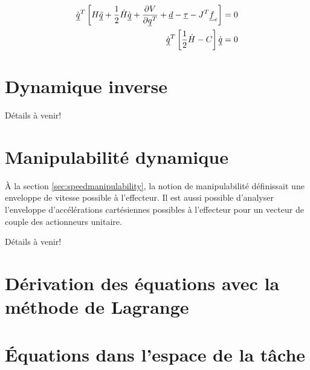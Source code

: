 \begin{align}
\dot{\underline{q}}^T \left[ H \underline{\ddot{q}} + \frac{1}{2}\dot{H}\dot{\underline{q}} + \frac{\partial V}{\partial \underline{q}^T} + \underline{d} - \underline{\tau} - J^T \underline{f}_e  \right] &= 0 \\
\dot{\underline{q}}^T \left[ \frac{1}{2}\dot{H} - C \right] \dot{\underline{q}} &= 0
\end{align}


\newpage
\section{Dynamique inverse}
\label{sec:inversedynamic}


Détails à venir!


\newpage
\section{Manipulabilité dynamique}
\label{sec:dynamicmanipulability}

À la section \ref{sec:speedmanipulability}, la notion de manipulabilité définissait une enveloppe de vitesse possible à l'effecteur. Il est aussi possible d'analyser l'enveloppe d'accélérations cartésiennes possibles à l'effecteur pour un vecteur de couple des actionneurs unitaire. 

Détails à venir!



\newpage
\section{Dérivation des équations avec la méthode de Lagrange}
\label{sec:lagrange}




\newpage
\section{Équations dans l'espace de la tâche}
\label{sec:taskdynamics}

